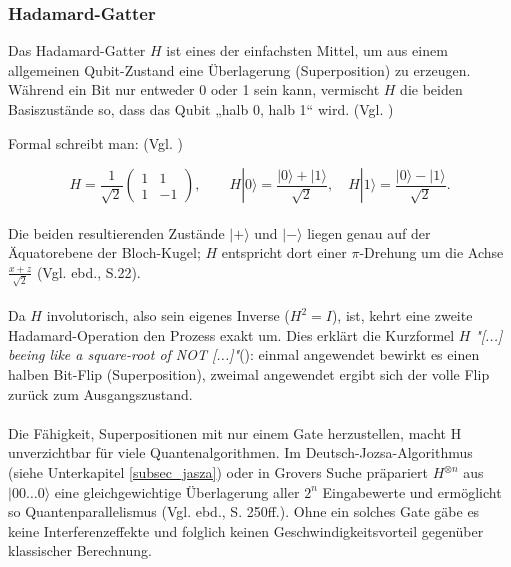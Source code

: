 \subsubsection{Hadamard-Gatter}\label{subsubsec:hadamard_gatter}
Das Hadamard-Gatter $H$ ist eines der einfachsten Mittel, um aus einem allgemeinen Qubit-Zustand eine Überlagerung (Superposition) zu erzeugen.  Während ein Bit nur entweder 0 oder 1 sein kann, vermischt $H$ die beiden Basiszustände so, dass das Qubit  „halb 0, halb 1“ wird. (Vgl. \cite[S.19f.]{nielsen_quantum_2010})

Formal schreibt man: (Vgl. \cite[S.76]{rieffel_quantum_2011})

\begin{equation}
  H = \frac1{\sqrt2}\!
  \begin{pmatrix} 1 & 1 \\ 1 & -1 \end{pmatrix},
  \qquad
  H|0\rangle=\frac{|0\rangle+|1\rangle}{\sqrt2},
  \quad
  H|1\rangle=\frac{|0\rangle-|1\rangle}{\sqrt2}.
\end{equation}
\\
Die beiden resultierenden Zustände $|+\rangle$ und $|-\rangle$ liegen genau auf der Äquatorebene der Bloch-Kugel; $H$ entspricht dort einer $\pi$-Drehung um die Achse $\tfrac{x+z}{\sqrt2}$ (Vgl. ebd., S.22).\\
\\
Da $H$ involutorisch, also sein eigenes Inverse ($H^2=I$), ist, kehrt eine zweite Hadamard-Operation den Prozess exakt um.  Dies erklärt die Kurzformel $H$ \emph{"[...] beeing like a square-root of NOT [...]"}(\cite[S.19]{nielsen_quantum_2010}): einmal angewendet bewirkt es einen halben Bit-Flip (Superposition), zweimal angewendet ergibt sich der volle Flip zurück zum Ausgangszustand.\\
\\
Die Fähigkeit, Superpositionen mit nur einem Gate herzustellen, macht H unverzichtbar für viele Quantenalgorithmen.  Im Deutsch-Jozsa-Algorithmus (siehe Unterkapitel \ref{subsec_jasza}) oder in Grovers Suche präpariert $H^{\otimes n}$ aus $|00\ldots0\rangle$ eine gleichgewichtige Überlagerung aller $2^{n}$ Eingabewerte und ermöglicht so Quantenparallelismus (Vgl. ebd., S. 250ff.).  Ohne ein solches Gate gäbe es keine Interferenzeffekte und folglich keinen Geschwindigkeitsvorteil gegenüber klassischer Berechnung.



